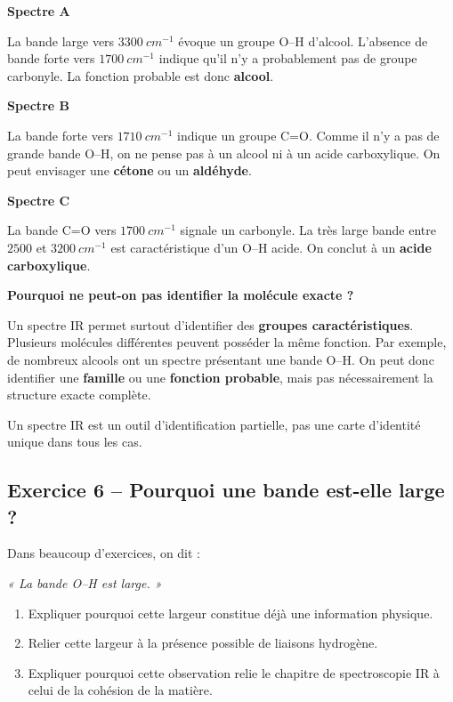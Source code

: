\documentclass[11pt,a4paper]{article}
\begin{document}
\begin{corrigebox}
\textbf{Spectre A}

La bande large vers \(3300\ \si{cm^{-1}}\) évoque un groupe O--H d'alcool.  
L'absence de bande forte vers \(1700\ \si{cm^{-1}}\) indique qu'il n'y a probablement pas de groupe carbonyle.  
La fonction probable est donc \textbf{alcool}.

\textbf{Spectre B}

La bande forte vers \(1710\ \si{cm^{-1}}\) indique un groupe C=O.  
Comme il n'y a pas de grande bande O--H, on ne pense pas à un alcool ni à un acide carboxylique.  
On peut envisager une \textbf{cétone} ou un \textbf{aldéhyde}.

\textbf{Spectre C}

La bande C=O vers \(1700\ \si{cm^{-1}}\) signale un carbonyle.  
La très large bande entre \(2500\) et \(3200\ \si{cm^{-1}}\) est caractéristique d'un O--H acide.  
On conclut à un \textbf{acide carboxylique}.

\textbf{Pourquoi ne peut-on pas identifier la molécule exacte ?}

Un spectre IR permet surtout d'identifier des \textbf{groupes caractéristiques}.  
Plusieurs molécules différentes peuvent posséder la même fonction.  
Par exemple, de nombreux alcools ont un spectre présentant une bande O--H.  
On peut donc identifier une \textbf{famille} ou une \textbf{fonction probable}, mais pas nécessairement la structure exacte complète.

\begin{attentionbox}
Un spectre IR est un outil d'identification partielle, pas une carte d'identité unique dans tous les cas.
\end{attentionbox}
\end{corrigebox}

\subsection{Exercice 6 -- Pourquoi une bande est-elle large ?}

\begin{enoncebox}
Dans beaucoup d'exercices, on dit :
\begin{center}
\textit{« La bande O--H est large. »}
\end{center}

\begin{enumerate}[label=\arabic*)]
    \item Expliquer pourquoi cette largeur constitue déjà une information physique.
    \item Relier cette largeur à la présence possible de liaisons hydrogène.
    \item Expliquer pourquoi cette observation relie le chapitre de spectroscopie IR à celui de la cohésion de la matière.
\end{enumerate}
\end{enoncebox}
\end{document}
